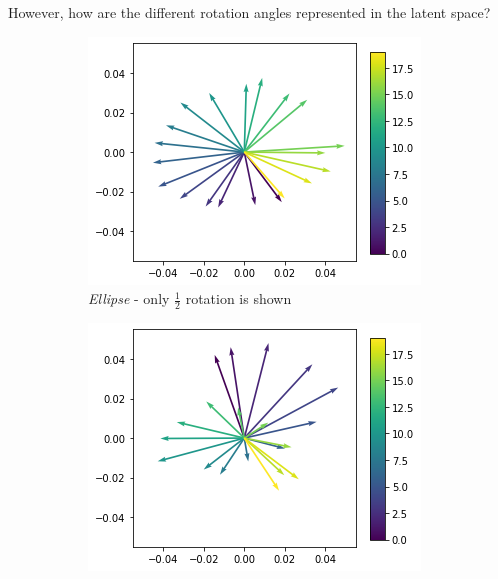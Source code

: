 However, how are the different rotation angles represented in the latent space?

\begin{figure}
    \centering
    \begin{subfigure}{.3\textwidth}
        \includegraphics[width=\textwidth]{images/latent_space_traversals/vae_dsprites_orientation_latent_space.png}
        \caption{\textit{Ellipse} - only $\frac{1}{2}$ rotation is shown}
    \end{subfigure}
    \hfill
    \begin{subfigure}{.3\textwidth}
        \includegraphics[width=\textwidth]{images/latent_space_traversals/vae_dsprites_orientation_latent_space_heart.png}

\end{subfigure}
\end{figure}
